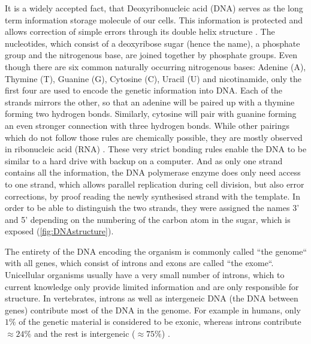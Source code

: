 It is a widely accepted fact, that Deoxyribonucleic acid (DNA) serves as the long term information storage molecule of our cells. This information is protected and allows correction of simple errors through its double helix structure \cite{Watson1953,Liang1998}. The nucleotides, which consist of a deoxyribose sugar (hence the name), a phosphate group and the nitrogenous base, are joined together by phosphate groups. Even though there are six common naturally occurring nitrogenous bases: Adenine (A), Thymine (T), Guanine (G), Cytosine (C), Uracil (U) and nicotinamide, only the first four are used to encode the genetic information into DNA. Each of the strands mirrors the other, so that an adenine will be paired up with a thymine forming two hydrogen bonds. Similarly, cytosine will pair with guanine forming an even stronger connection with three hydrogen bonds. While other pairings which do not follow those rules are chemically possible, they are mostly observed in ribonucleic acid (RNA) \cite{Sinden1994}. These very strict bonding rules enable the DNA to be similar to a hard drive with backup on a computer. And as only one strand contains all the information, the DNA polymerase enzyme does only need access to one strand, which allows parallel replication during cell division, but also error corrections, by proof reading the newly synthesised strand with the template. In order to be able to distinguish the two strands, they were assigned the names 3' and 5' depending on the numbering of the carbon atom in the sugar, which is exposed (\autoref{fig:DNAstructure}).

The entirety of the DNA encoding the organism is commonly called ``the genome`` with all genes, which consist of introns and exons are called ``the exome``. Unicellular organisms usually have a very small number of introns, which to current knowledge only provide limited information and are only responsible for structure. In vertebrates,  introns as well as intergeneic DNA (the DNA between genes) contribute most of the DNA in the genome. For example in humans, only $1\%$ of the genetic material is considered to be exonic, whereas introns contribute $\approx 24\%$ and the rest is intergeneic ($\approx 75\%$) \cite{Venter2001}.

